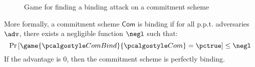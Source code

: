 \begin{figure}[tbhp]
  \begin{center}
    \begin{tcolorbox}[width=8cm]
      \begin{pchstack}[center]
      \end{pchstack}
    \end{tcolorbox}
  \end{center}
  \caption{Game for finding a binding attack on a commitment scheme \label{fig:break-com-bind}}
\end{figure}


More formally, a commitment scheme $\mathsf{Com}$ is binding if for all p.p.t. adversaries $\adv$, there exists a negligible function $\negl$ such that:
\[ \pr{\game{\algo{ComBind}}{\algo{Com}} = \pctrue} \leq \negl \]
If the advantage is 0, then the commitment scheme is perfectly binding.






